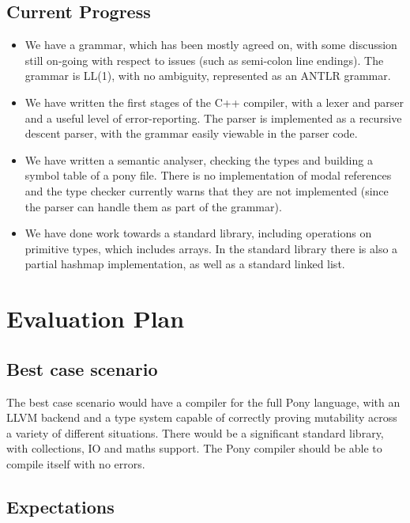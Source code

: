\documentclass[11pt,a4paper]{report}
\begin{document}
\section{Current Progress}

\begin{itemize}
\item We have a grammar, which has been mostly agreed on, with some discussion still on-going with respect to issues (such as semi-colon line endings).
	The grammar is LL(1), with no ambiguity, represented as an ANTLR grammar. 
\item We have written the first stages of the C++ compiler, with a lexer and parser and a useful level of error-reporting.
	The parser is implemented as a recursive descent parser, with the grammar easily viewable in the parser code.
\item We have written a semantic analyser, checking the types and building a symbol table of a pony file.
	There is no implementation of modal references and the type checker currently warns that they are not implemented (since the parser can handle them as part of the grammar).
\item We have done work towards a standard library, including operations on primitive types, which includes arrays.
	In the standard library there is also a partial hashmap implementation, as well as a standard linked list.
\end{itemize}

\newpage
\chapter{Evaluation Plan}
\label{chapter:evaluation}

\section{Best case scenario}

The best case scenario would have a compiler for the full Pony language, with an LLVM backend and a type system capable of correctly proving mutability across a variety of different situations.
There would be a significant standard library, with collections, IO and maths support.
The Pony compiler should be able to compile itself with no errors.

\section{Expectations}
\end{document}
